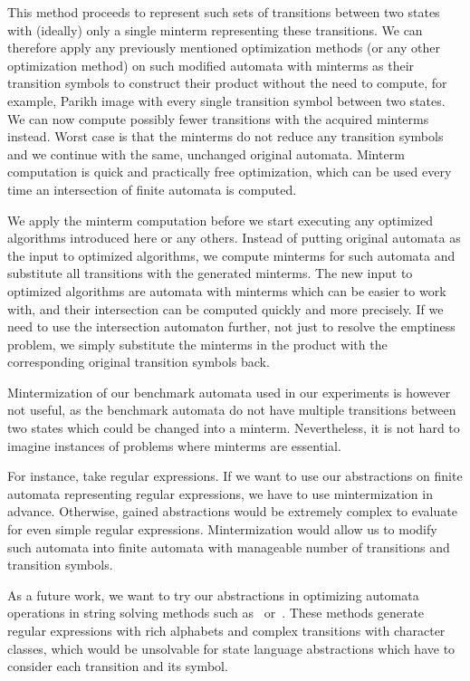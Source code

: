 This method proceeds to represent such sets of transitions between two states with (ideally) only a single minterm representing these transitions. We can therefore apply any previously mentioned optimization methods (or any other optimization method) on such modified automata with minterms as their transition symbols to construct their product without the need to compute, for example, Parikh image with every single transition symbol between two states. We can now compute possibly fewer transitions with the acquired minterms instead. Worst case is that the minterms do not reduce any transition symbols and we continue with the same, unchanged original automata. Minterm computation is quick and practically free optimization, which can be used every time an intersection of finite automata is computed.

We apply the minterm computation before we start executing any optimized algorithms introduced here or any others. Instead of putting original automata as the input to optimized algorithms, we compute minterms for such automata and substitute all transitions with the generated minterms. The new input to optimized algorithms are automata with minterms which can be easier to work with, and their intersection can be computed quickly and more precisely. If we need to use the intersection automaton further, not just to resolve the emptiness problem, we simply substitute the minterms in the product with the corresponding original transition symbols back.

Mintermization of our benchmark automata used in our experiments is however not useful, as the benchmark automata do not have multiple transitions between two states which could be changed into a minterm. Nevertheless, it is not hard to imagine instances of problems where minterms are essential.

For instance, take regular expressions. If we want to use our abstractions on finite automata representing regular expressions, we have to use mintermization in advance. Otherwise, gained abstractions would be extremely complex to evaluate for even simple regular expressions. Mintermization would allow us to modify such automata into finite automata with manageable number of transitions and transition symbols.

As a future work, we want to try our abstractions in optimizing automata operations in string solving methods such as~\cite{10.1007/978-3-319-08867-9_10} or~\cite{DBLP:conf/popl/LinB16}. These methods generate regular expressions with rich alphabets and complex transitions with character classes, which would be unsolvable for state language abstractions which have to consider each transition and its symbol.

